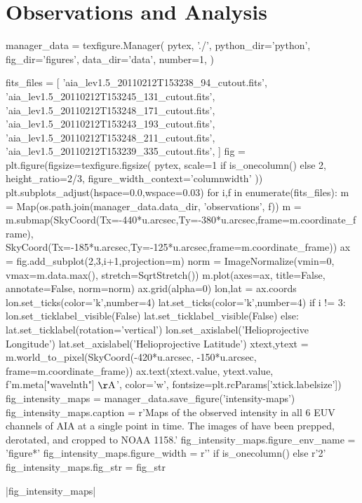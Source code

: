 \section{Observations and Analysis}\label{observations}

\begin{pycode}
manager_data = texfigure.Manager(
    pytex, './',
    python_dir='python',
    fig_dir='figures',
    data_dir='data',
    number=1,
)
\end{pycode}

\begin{pycode}
fits_files = [
    'aia_lev1.5_20110212T153238_94_cutout.fits',
    'aia_lev1.5_20110212T153245_131_cutout.fits',
    'aia_lev1.5_20110212T153248_171_cutout.fits',
    'aia_lev1.5_20110212T153243_193_cutout.fits',
    'aia_lev1.5_20110212T153248_211_cutout.fits',
    'aia_lev1.5_20110212T153239_335_cutout.fits',
]
fig = plt.figure(figsize=texfigure.figsize(
    pytex,
    scale=1 if is_onecolumn() else 2,
    height_ratio=2/3,
    figure_width_context='columnwidth'
))
plt.subplots_adjust(hspace=0.0,wspace=0.03)
for i,f in enumerate(fits_files):
    m = Map(os.path.join(manager_data.data_dir, 'observations', f))
    m = m.submap(SkyCoord(Tx=-440*u.arcsec,Ty=-380*u.arcsec,frame=m.coordinate_frame),
                 SkyCoord(Tx=-185*u.arcsec,Ty=-125*u.arcsec,frame=m.coordinate_frame))
    ax = fig.add_subplot(2,3,i+1,projection=m)
    norm = ImageNormalize(vmin=0, vmax=m.data.max(), stretch=SqrtStretch())
    m.plot(axes=ax, title=False, annotate=False, norm=norm)
    ax.grid(alpha=0)
    lon,lat = ax.coords
    lon.set_ticks(color='k',number=4)
    lat.set_ticks(color='k',number=4)
    if i != 3:
        lon.set_ticklabel_visible(False)
        lat.set_ticklabel_visible(False)
    else:
        lat.set_ticklabel(rotation='vertical')
        lon.set_axislabel('Helioprojective Longitude')
        lat.set_axislabel('Helioprojective Latitude')
    xtext,ytext = m.world_to_pixel(SkyCoord(-420*u.arcsec, -150*u.arcsec, frame=m.coordinate_frame))
    ax.text(xtext.value, ytext.value, f'{m.meta["wavelnth"]} $\mathrm{{\AA}}$',
            color='w', fontsize=plt.rcParams['xtick.labelsize'])
fig_intensity_maps = manager_data.save_figure('intensity-maps')
fig_intensity_maps.caption = r'Maps of the observed intensity in all 6 EUV channels of AIA at a single point in time. The images of have been prepped, derotated, and cropped to \AR{} NOAA 1158.'
fig_intensity_maps.figure_env_name = 'figure*'
fig_intensity_maps.figure_width = r'\columnwidth' if is_onecolumn() else r'2\columnwidth'
fig_intensity_maps.fig_str = fig_str
\end{pycode}
|fig_intensity_maps|

